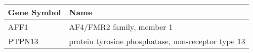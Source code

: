 \begin{tabular}{ll}
\toprule
Gene Symbol &                                               Name \\
\midrule
       AFF1 &                          AF4/FMR2 family, member 1 \\
     PTPN13 & protein tyrosine phosphatase, non-receptor type 13 \\
\bottomrule
\end{tabular}
